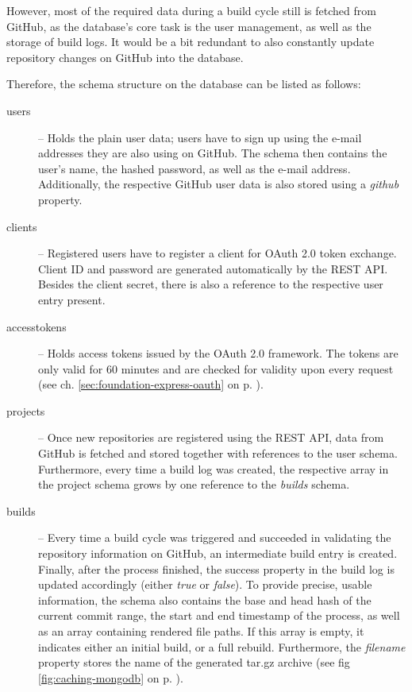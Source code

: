 However, most of the required data during a build cycle still is fetched from GitHub, as the database's core task is the user management, as well as the storage of build logs. It would be a bit redundant to also constantly update repository changes on GitHub into the database.

Therefore, the schema structure on the database can be listed as follows:

\begin{description}
  \item[users] -- Holds the plain user data; users have to sign up using the e-mail addresses they are also using on GitHub. The schema then contains the user's name, the hashed password, as well as the e-mail address. Additionally, the respective GitHub user data is also stored using a \emph{github} property.
  \item[clients] -- Registered users have to register a client for OAuth 2.0 token exchange. Client ID and password are generated automatically by the REST API. Besides the client secret, there is also a reference to the respective user entry present.
  \item[accesstokens] -- Holds access tokens issued by the OAuth 2.0 framework. The tokens are only valid for 60 minutes and are checked for validity upon every request (see ch. \ref{sec:foundation-express-oauth} on p. \pageref{sec:foundation-express-oauth}).
  \item[projects] -- Once new repositories are registered using the REST API, data from GitHub is fetched and stored together with references to the user schema. Furthermore, every time a build log was created, the respective array in the project schema grows by one reference to the \emph{builds} schema.
  \item[builds] -- Every time a build cycle was triggered and succeeded in validating the repository information on GitHub, an intermediate build entry is created. Finally, after the process finished, the success property in the build log is updated accordingly (either \emph{true} or \emph{false}). To provide precise, usable information, the schema also contains the base and head hash of the current commit range, the start and end timestamp of the process, as well as an array containing rendered file paths. If this array is empty, it indicates either an initial build, or a full rebuild. Furthermore, the \emph{filename} property stores the name of the generated tar.gz archive (see fig \ref{fig:caching-mongodb} on p. \pageref{fig:caching-mongodb}).
\end{description}
